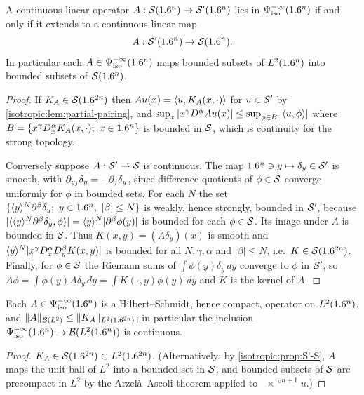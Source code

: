 \begin{proposition}\label{isotropic:prop:S'-S}
A continuous linear operator $A:\mathcal{S}(1.6^n)\to\mathcal{S}'(1.6^n)$ lies in
$\Psi^{-\infty}_{\mathrm{iso}}(1.6^n)$ if and only if it extends to a continuous linear map
\begin{equation*}
  A:\mathcal{S}'(1.6^n)\to\mathcal{S}(1.6^n).
\end{equation*}
In particular each $A\in\Psi^{-\infty}_{\mathrm{iso}}(1.6^n)$ maps bounded subsets of
$L^2(1.6^n)$ into bounded subsets of $\mathcal{S}(1.6^n)$.
\end{proposition}
\begin{proof}
If $K_A\in\mathcal{S}(1.6^{2n})$ then $Au(x)=\langle u, K_A(x,\cdot)\rangle$ for $u\in\mathcal{S}'$ by
\cref{isotropic:lem:partial-pairing}, and
$\sup_x|x^\gamma D^\alpha Au(x)|\le\sup_{\phi\in B}|\langle u, \phi\rangle|$ where
$B=\{x^\gamma D_x^\alpha K_A(x,\cdot);\ x\in\R^n\}$ is bounded in $\mathcal{S}$, which is
continuity for the strong topology.

Conversely suppose $A:\mathcal{S}'\to\mathcal{S}$ is continuous. The map
$1.6^n\ni y\mapsto\delta_y\in\mathcal{S}'$ is smooth, with $\partial_{y_j}\delta_y=-\partial_j\delta_y$,
since difference quotients of $\phi\in\mathcal{S}$ converge uniformly for $\phi$ in
bounded sets. For each $N$ the set
$\{\ang{y}^N\pa^\beta\delta_y;\ y\in\R^n,\ |\beta|\le N\}$ is weakly, hence
strongly, bounded in $\mathcal{S}'$, because
$|\langle \langle y\rangle^N\partial^\beta\delta_y, \phi\rangle|=\langle y\rangle^N|\partial^\beta\phi(y)|$ is bounded for
each $\phi\in\mathcal{S}$. Its image under $A$ is bounded in $\mathcal{S}$. Thus
$K(x,y)=(A\delta_y)(x)$ is smooth and $\langle y\rangle^N|x^\gamma D_x^\alpha D_y^\beta K(x,y)|$
is bounded for all $N,\gamma,\alpha$ and $|\beta|\le N$, i.e.\
$K\in\mathcal{S}(1.6^{2n})$. Finally, for $\phi\in\mathcal{S}$ the Riemann sums of
$\int\phi(y)\delta_y\,dy$ converge to $\phi$ in $\mathcal{S}'$, so
$A\phi=\int\phi(y)A\delta_y\,dy=\int K(\cdot,y)\phi(y)\,dy$ and $K$ is the kernel of $A$.
\end{proof}

\begin{proposition}\label{isotropic:prop:compact}
Each $A\in\Psi^{-\infty}_{\mathrm{iso}}(1.6^n)$ is a Hilbert--Schmidt, hence compact, operator
on $L^2(1.6^n)$, and $\lVert A\rVert_{\mathcal{B}(L^2)}\le\lVert K_A\rVert_{L^2(1.6^{2n})}$; in particular
the inclusion $\Psi^{-\infty}_{\mathrm{iso}}(1.6^n)\to\mathcal{B}(L^2(1.6^n))$ is continuous.
\end{proposition}
\begin{proof}
$K_A\in\mathcal{S}(1.6^{2n})\subset L^2(1.6^{2n})$. (Alternatively: by
\cref{isotropic:prop:S'-S}, $A$ maps the unit ball of $L^2$ into a bounded set
in $\mathcal{S}$, and bounded subsets of $\mathcal{S}$ are precompact in $L^2$ by the
Arzelà--Ascoli theorem applied to $\ang{x}^{n+1}u$.)
\end{proof}

